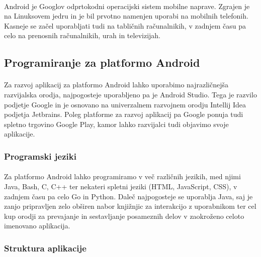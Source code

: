 \paragraph{}Android je Googlov odprtokodni\cite{android-source} operacijski sistem mobilne naprave. Zgrajen je na Linuksovem jedru\cite{linux-kernel-wiki} in je bil prvotno namenjen uporabi na mobilnih telefonih. Kasneje se začel uporabljati tudi na tabličnih računalnikih, v zadnjem času pa celo na prenosnih računalnikih, urah in televizijah.

\subsection{Programiranje za platformo Android}
\paragraph{}Za razvoj aplikacij za platformo Android lahko uporabimo najrazličnejša razvijalska orodja, najpogosteje uporabljeno pa je Android Studio. Tega je razvilo podjetje Google in je osnovano na univerzalnem razvojnem orodju Intellij Idea\cite{intellij-idea} podjetja Jetbrains. Poleg platforme za razvoj aplikacij pa Google ponuja tudi spletno trgovino Google Play, kamor lahko razvijalci tudi objavimo svoje aplikacije.

\subsubsection{Programski jeziki}
\paragraph{}Za platformo Android lahko programiramo v več različnih jezikih, med njimi Java, Bash, C, C++ ter nekateri spletni jeziki (HTML, JavaScript, CSS), v zadnjem času pa celo Go in Python. Daleč najpogosteje se uporablja Java, saj je zanjo pripravljen zelo obširen nabor knjižnjic za interakcijo z uporabnikom ter cel kup orodji za prevajanje in sestavljanje posameznih delov v zaokroženo celoto imenovano aplikacija.

\subsubsection{Struktura aplikacije}
